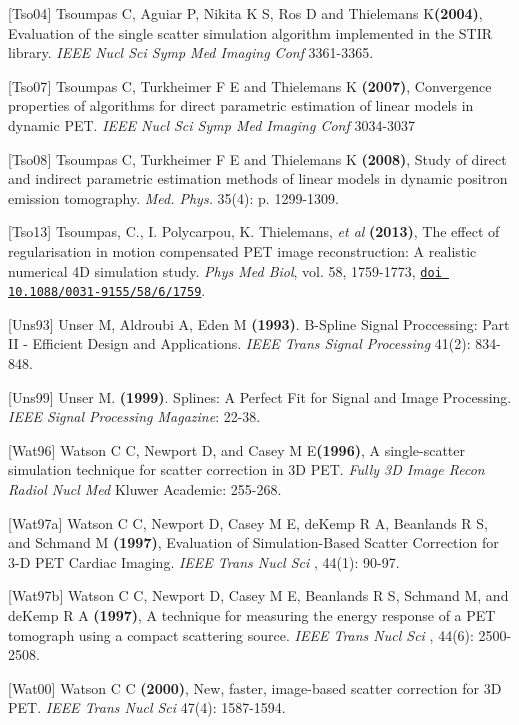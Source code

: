\documentclass{article}
\def\url#1#2{\mbox{\href{#1}{\tt #2}}}
\begin{document}
{{[}Tso04{]} Tsoumpas C, Aguiar P, Nikita K S, Ros D and Thielemans K\textbf{(2004)}, 
Evaluation of the single scatter simulation algorithm implemented in the STIR library. 
\textit { IEEE Nucl Sci Symp Med Imaging Conf } 3361-3365.

{[}Tso07{]} Tsoumpas C, Turkheimer F E and Thielemans K  \textbf{(2007)}, 
Convergence properties of algorithms for direct parametric estimation of linear models in dynamic PET. 
\textit{IEEE Nucl Sci Symp Med Imaging Conf} 3034-3037

{[}Tso08{]} Tsoumpas C, Turkheimer F E and Thielemans K \textbf{(2008)}, Study of direct and indirect 
parametric estimation methods of linear models in dynamic positron emission tomography. \textit{Med. Phys.} 
35(4): p. 1299-1309.

[Tso13] Tsoumpas, C., I.
Polycarpou, K. Thielemans, \textit{et al} \textbf{(2013)}, The effect of
regularisation in motion compensated PET image reconstruction: A realistic
numerical 4D simulation study. \textit{Phys Med Biol}, vol. 58, 1759-1773, 
\url{http://dx.doi.org/10.1088/0031-9155/58/6/1759}{doi 10.1088/0031-9155/58/6/1759}.


{[}Uns93] Unser M, Aldroubi A, Eden M \textbf{(1993)}. B-Spline Signal Proccessing: Part II - Efficient Design and Applications.  \textit{IEEE Trans Signal Processing} 41(2): 834-848.

{[}Uns99] Unser M. \textbf{(1999)}. Splines: A Perfect Fit for Signal and Image Processing. \textit{IEEE Signal Processing Magazine}: 22-38.

{[}Wat96{]} Watson C C, Newport D, and Casey M E\textbf{(1996)}, 
A single-scatter simulation technique for scatter correction in 3D PET. 
\textit { Fully 3D Image Recon Radiol Nucl Med} Kluwer Academic: 255-268. 

{[}Wat97a{]} Watson C C, Newport D, Casey M E, deKemp R A, Beanlands R S, and Schmand M 
\textbf{(1997)}, Evaluation of Simulation-Based Scatter Correction for 3-D PET Cardiac Imaging. 
\textit { IEEE Trans Nucl Sci }, 44(1): 90-97.

{[}Wat97b{]} Watson C C, Newport D, Casey M E, Beanlands R S, Schmand M, and deKemp R A 
\textbf{(1997)}, A technique for measuring the energy response of a PET tomograph using a compact scattering source. 
\textit { IEEE Trans Nucl Sci }, 44(6): 2500-2508.

{[}Wat00{]} Watson C C \textbf{(2000)}, New, faster, image-based scatter correction for 3D PET. 
\textit { IEEE Trans Nucl Sci } 47(4): 1587-1594. 

}
\end{document}
